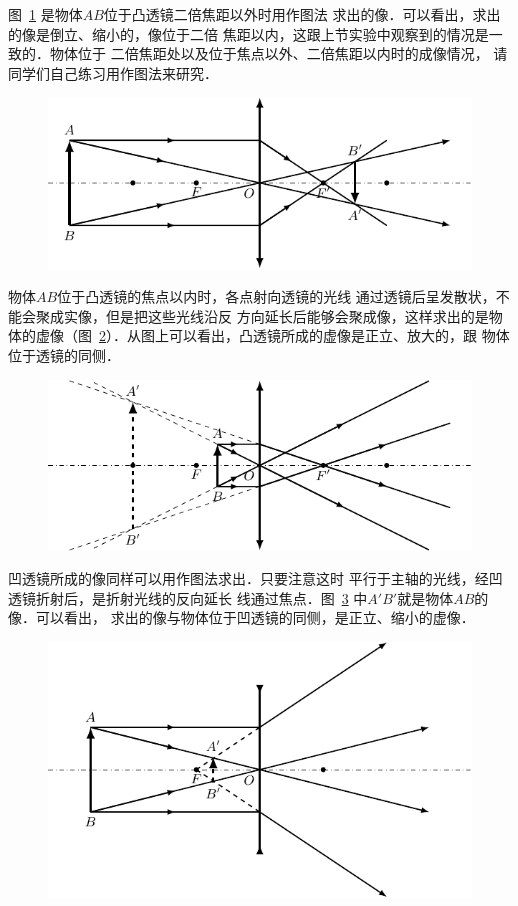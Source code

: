图~\ref{fig_C_5-42} 是物体$AB$位于凸透镜二倍焦距以外时用作图法
求出的像．可以看出，求出的像是倒立、缩小的，像位于二倍
焦距以内，这跟上节实验中观察到的情况是一致的．物体位于
二倍焦距处以及位于焦点以外、二倍焦距以内时的成像情况，
请同学们自己练习用作图法来研究．
\begin{figure}[htbp]
    \centering
    \includegraphics{fig/C/5-42.pdf}
    \caption{}\label{fig_C_5-42}
\end{figure}

物体$AB$位于凸透镜的焦点以内时，各点射向透镜的光线
通过透镜后呈发散状，不能会聚成实像，但是把这些光线沿反
方向延长后能够会聚成像，这样求出的是物体的虚像（图~\ref{fig_C_5-43}）．从图上可以看出，凸透镜所成的虚像是正立、放大的，跟
物体位于透镜的同侧．

\begin{figure}[htbp]
    \centering
    \includegraphics{fig/C/5-43.pdf}
    \caption{}\label{fig_C_5-43}
\end{figure}

凹透镜所成的像同样可以用作图法求出．只要注意这时
平行于主轴的光线，经凹透镜折射后，是折射光线的反向延长
线通过焦点．图~\ref{fig_C_5-44} 中$A'B'$就是物体$AB$的像．可以看出，
求出的像与物体位于凹透镜的同侧，是正立、缩小的虚像．

\begin{figure}[htbp]
    \centering
    \includegraphics{fig/C/5-44.pdf}
    \caption{}\label{fig_C_5-44}
\end{figure}

